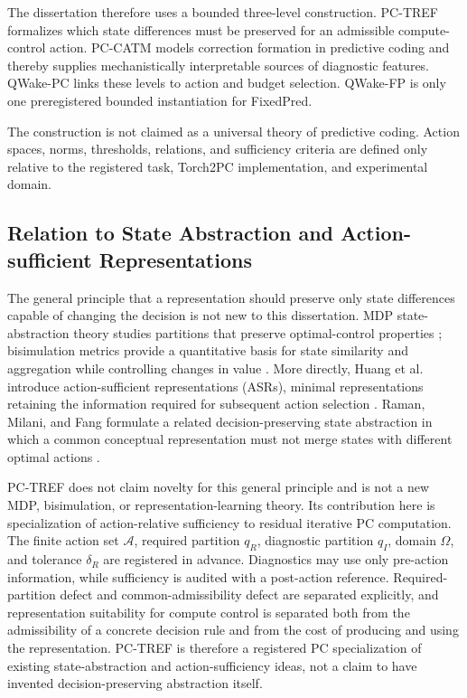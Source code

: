 The dissertation therefore uses a bounded three-level construction. PC-TREF formalizes
which state differences must be preserved for an admissible compute-control action.
PC-CATM models correction formation in predictive coding and thereby supplies
mechanistically interpretable sources of diagnostic features. QWake-PC links these
levels to action and budget selection. QWake-FP is only one preregistered bounded
instantiation for FixedPred.

The construction is not claimed as a universal theory of predictive coding. Action
spaces, norms, thresholds, relations, and sufficiency criteria are defined only
relative to the registered task, Torch2PC implementation, and experimental domain.

\subsection{Relation to State Abstraction and Action-sufficient Representations}
\label{sec:theory-state-abstraction-basis}

The general principle that a representation should preserve only state differences
capable of changing the decision is not new to this dissertation. MDP state-abstraction
theory studies partitions that preserve optimal-control properties
\cite{li2006stateabstraction}; bisimulation metrics provide a quantitative basis for
state similarity and aggregation while controlling changes in value
\cite{ferns2004metrics}. More directly, Huang et al. introduce action-sufficient
representations (ASRs), minimal representations retaining the information required for
subsequent action selection \cite{huang2022actionsufficient}. Raman, Milani, and Fang
formulate a related decision-preserving state abstraction in which a common conceptual
representation must not merge states with different optimal actions
\cite{raman2026decisionrelevant}.

PC-TREF does not claim novelty for this general principle and is not a new MDP,
bisimulation, or representation-learning theory. Its contribution here is specialization
of action-relative sufficiency to residual iterative PC computation. The finite action
set $\mathcal A$, required partition $q_R$, diagnostic partition $q_I$, domain
$\Omega$, and tolerance $\delta_R$ are registered in advance. Diagnostics may use only
pre-action information, while sufficiency is audited with a post-action reference.
Required-partition defect and common-admissibility defect are separated explicitly,
and representation suitability for compute control is separated both from the
admissibility of a concrete decision rule and from the cost of producing and using the
representation. PC-TREF is therefore a registered PC specialization of existing
state-abstraction and action-sufficiency ideas, not a claim to have invented
decision-preserving abstraction itself.

